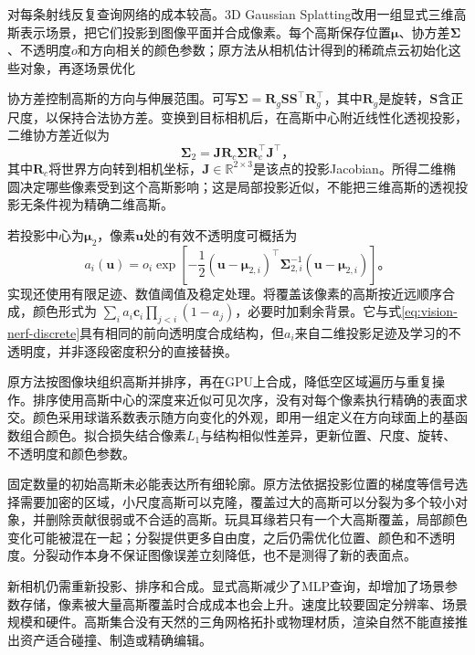 对每条射线反复查询网络的成本较高。3D Gaussian Splatting改用一组显式三维高斯表示场景，把它们投影到图像平面并合成像素。每个高斯保存位置$\bm{\mu}$、协方差$\bm{\Sigma}$、不透明度$o$和方向相关的颜色参数；原方法从相机估计得到的稀疏点云初始化这些对象，再逐场景优化

协方差控制高斯的方向与伸展范围。可写$\bm{\Sigma}=\bm{R}_{g}\bm{S}\bm{S}^{\top}\bm{R}_{g}^{\top}$，其中$\bm{R}_{g}$是旋转，$\bm{S}$含正尺度，以保持合法协方差。变换到目标相机后，在高斯中心附近线性化透视投影，二维协方差近似为
\begin{equation}
 \bm{\Sigma}_{2}
 =\bm{J}\bm{R}_{c}\bm{\Sigma}
    \bm{R}_{c}^{\top}\bm{J}^{\top}\text{，}
 \label{eq:vision-gaussian-projection}
\end{equation}
其中$\bm{R}_{c}$将世界方向转到相机坐标，$\bm{J}\in\mathbb{R}^{2\times3}$是该点的投影Jacobian。所得二维椭圆决定哪些像素受到这个高斯影响；这是局部投影近似，不能把三维高斯的透视投影无条件视为精确二维高斯。

若投影中心为$\bm{\mu}_{2}$，像素$\bm{u}$处的有效不透明度可概括为
\begin{equation}
 a_i(\bm{u})=o_i\exp\!\left[
 -\frac12(\bm{u}-\bm{\mu}_{2,i})^\top
 \bm{\Sigma}_{2,i}^{-1}(\bm{u}-\bm{\mu}_{2,i})
 \right]\text{。}
 \label{eq:vision-gaussian-alpha}
\end{equation}
实现还使用有限足迹、数值阈值及稳定处理。将覆盖该像素的高斯按近远顺序合成，颜色形式为
$\sum_i a_i\bm{c}_i\prod_{j<i}(1-a_j)$，必要时加剩余背景。它与式\eqref{eq:vision-nerf-discrete}具有相同的前向透明度合成结构，但$a_i$来自二维投影足迹及学习的不透明度，并非逐段密度积分的直接替换。

原方法按图像块组织高斯并排序，再在GPU上合成，降低空区域遍历与重复操作。排序使用高斯中心的深度来近似可见次序，没有对每个像素执行精确的表面求交。颜色采用球谐系数表示随方向变化的外观，即用一组定义在方向球面上的基函数组合颜色。拟合损失结合像素$L_1$与结构相似性差异，更新位置、尺度、旋转、不透明度和颜色参数。

固定数量的初始高斯未必能表达所有细轮廓。原方法依据投影位置的梯度等信号选择需要加密的区域，小尺度高斯可以克隆，覆盖过大的高斯可以分裂为多个较小对象，并删除贡献很弱或不合适的高斯。玩具耳缘若只有一个大高斯覆盖，局部颜色变化可能被混在一起；分裂提供更多自由度，之后仍需优化位置、颜色和不透明度。分裂动作本身不保证图像误差立刻降低，也不是测得了新的表面点。

新相机仍需重新投影、排序和合成。显式高斯减少了MLP查询，却增加了场景参数存储，像素被大量高斯覆盖时合成成本也会上升。速度比较要固定分辨率、场景规模和硬件。高斯集合没有天然的三角网格拓扑或物理材质，渲染自然不能直接推出资产适合碰撞、制造或精确编辑。

